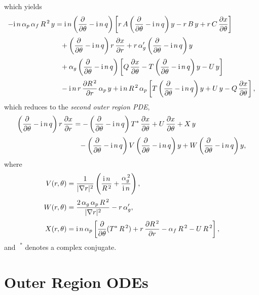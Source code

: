 \documentclass[12pt,prb,aps]{revtex4-1}
\begin{document}
which yields
\begin{align}
-{\rm i}\,n\,\alpha_p\,\alpha_f\,R^{\,2}\,y&={\rm i}\,n\left(\frac{\partial}{\partial\theta}-{\rm i}\,n\,q\right)\left[r\,A\left(\frac{\partial}{\partial \theta}-{\rm i}\,n\,q\right)y-r\,B\,y+r\,C\,\frac{\partial x}{\partial\theta}\right]\nonumber\\[0.5ex]&\phantom= +\left(\frac{\partial}{\partial\theta}-{\rm i}\,n\,q\right)r\,\frac{\partial x}{\partial r}  +r\,\alpha_g'\left(\frac{\partial}{\partial\theta}-{\rm i}\,n\,q\right)y \nonumber\\[0.5ex]
&\phantom{=}+ \alpha_g\left(\frac{\partial}{\partial\theta}-{\rm i}\,n\,q\right)\left[Q\,\frac{\partial x}{\partial\theta}
-T\left(\frac{\partial}{\partial\theta}-{\rm i}\,n\,q\right)y-U\,y\right]\nonumber\\[0.5ex]&\phantom{=}
-{\rm i}\,n\,r\,\frac{\partial R^{\,2}}{\partial r}\,\alpha_p\,y+{\rm i}\,n\,R^{\,2}\,\alpha_p \left[T\left(\frac{\partial}{\partial\theta}-{\rm i}\,n\,q\right)y + U\,y -Q\,\frac{\partial x}{\partial\theta}\right],
\end{align}
which reduces to the {\em second outer region PDE}, \cite{connor}
\begin{align}\label{esecond}
\left(\frac{\partial}{\partial\theta}-{\rm i}\,n\,q\right)r\,\frac{\partial x}{\partial r} &= -\left(\frac{\partial}{\partial\theta}-{\rm i}\,n\,q\right)T^\ast\,\frac{\partial x}{\partial \theta} + U\,\frac{\partial x}{\partial\theta}+X\,y\nonumber\\[0.5ex]&\phantom{=} -\left(\frac{\partial}{\partial\theta}-{\rm i}\,n\,q\right)V\left(\frac{\partial}{\partial\theta}-{\rm i}\,n\,q\right)y + W\left(\frac{\partial}{\partial\theta}-{\rm i}\,n\,q\right)y,
\end{align}
where
\begin{align}
V(r,\theta)&= \frac{1}{|\nabla r|^2}\left(\frac{{\rm i}\,n}{R^{\,2}}+\frac{\alpha_g^{\,2}}{{\rm i}\,n}\right),\label{ev}\\[0.5ex]
W(r,\theta)&= \frac{2\,\alpha_g\,\alpha_p\,R^{\,2}}{|\nabla r|^2} -r\,\alpha_g',\label{ew}\\[0.5ex]
X(r,\theta)&= {\rm i}\,n\,\alpha_p\left[\frac{\partial}{\partial \theta}(T^\ast\,R^{\,2})+r\,\frac{\partial R^{\,2}}{\partial r}-\alpha_f\,R^{\,2}-U\,R^{\,2}\right],\label{ex}
\end{align}
and $\phantom{!}^\ast$ denotes a complex conjugate. 

\section{Outer Region ODEs}\label{sode}
\end{document}
